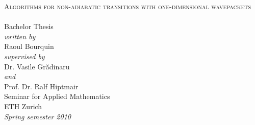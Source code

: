\begin{titlepage}
\begin{center}
  \hfill
  \vspace{3.0cm}

  {\huge \textsc{Algorithms for non-adiabatic transitions
  with one-dimensional wavepackets\\[10pt]
  }}
  ~\\[20pt]

  {\huge{Bachelor Thesis}}\\[2.5cm]

  {\emph{written by}}\\
  Raoul Bourquin
  \\[0.6cm]
  {\emph{supervised by}}\\
  Dr. Vasile Gr\u{a}dinaru\\
  {\emph{and}}\\
  Prof. Dr. Ralf Hiptmair
  \\[2.5cm]

  Seminar for Applied Mathematics\\
  ETH Zurich
  \\[0.5cm]
  \emph{{Spring semester 2010}}
\end{center}
\end{titlepage}